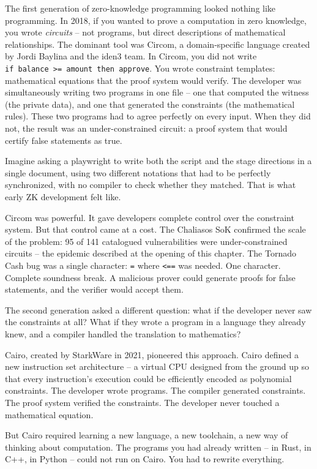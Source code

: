 \documentclass[
  11pt,
  openany]{report}
\begin{document}
The first generation of zero-knowledge programming looked nothing like
programming. In 2018, if you wanted to prove a computation in zero knowledge,
you wrote \emph{circuits} -- not programs, but direct descriptions of
mathematical relationships. The dominant tool was Circom, a domain-specific
language created by Jordi Baylina and the iden3 team. In Circom, you did not
write \texttt{if\ balance\ \textgreater{}=\ amount\ then\ approve}. You wrote
constraint templates: mathematical equations that the proof system would verify.
The developer was simultaneously writing two programs in one file -- one that
computed the witness (the private data), and one that generated the constraints
(the mathematical rules). These two programs had to agree perfectly on every
input. When they did not, the result was an under-constrained circuit: a proof
system that would certify false statements as true.

Imagine asking a playwright to write both the script and the stage directions in
a single document, using two different notations that had to be perfectly
synchronized, with no compiler to check whether they matched. That is what early
ZK development felt like.

Circom was powerful. It gave developers complete control over the constraint
system. But that control came at a cost. The Chaliasos SoK confirmed the scale
of the problem: 95 of 141 catalogued vulnerabilities were under-constrained
circuits -- the epidemic described at the opening of this chapter. The Tornado
Cash bug was a single character: \texttt{=} where \texttt{\textless{}==} was
needed. One character. Complete soundness break. A malicious prover could
generate proofs for false statements, and the verifier would accept them.

The second generation asked a different question: what if the developer never
saw the constraints at all? What if they wrote a program in a language they
already knew, and a compiler handled the translation to mathematics?

Cairo, created by StarkWare in 2021, pioneered this approach. Cairo defined a
new instruction set architecture -- a virtual CPU designed from the ground up so
that every instruction's execution could be efficiently encoded as polynomial
constraints. The developer wrote programs. The compiler generated constraints.
The proof system verified the constraints. The developer never touched a
mathematical equation.

But Cairo required learning a new language, a new toolchain, a new way of
thinking about computation. The programs you had already written -- in Rust, in
C++, in Python -- could not run on Cairo. You had to rewrite everything.
\end{document}
